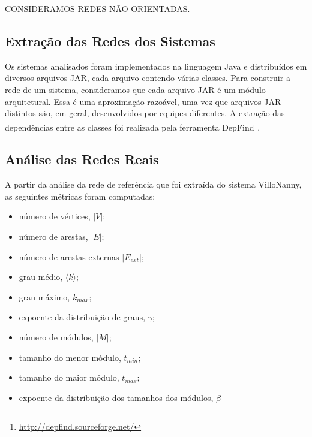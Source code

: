 \documentclass{acm_proc_article-sp}
\begin{document}
CONSIDERAMOS REDES NÃO-ORIENTADAS.

\subsection{Extração das Redes dos Sistemas}

Os sistemas analisados foram implementados na linguagem Java e distribuídos em diversos arquivos JAR, cada arquivo contendo várias classes. Para construir a rede de um sistema, consideramos que cada arquivo JAR é um módulo arquitetural. Essa é uma aproximação razoável, uma vez que arquivos JAR distintos são, em geral, desenvolvidos por equipes diferentes. A extração das dependências entre as classes foi realizada pela ferramenta DepFind\footnote{\url{http://depfind.sourceforge.net/}}.


\subsection{Análise das Redes Reais}


A partir da análise da rede de referência que foi extraída do sistema VilloNanny, as seguintes métricas foram computadas:

\begin{itemize}
\item número de vértices, $|V|$;
\item número de arestas, $|E|$;
\item número de arestas externas $|E_{ext}|$;
\item grau médio, $\langle k \rangle$;
\item grau máximo, $k_{max}$;
\item expoente da distribuição de graus, $\gamma$;
\item número de módulos, $|M|$;
\item tamanho do menor módulo, $t_{min}$;
\item tamanho do maior módulo, $t_{max}$;
\item expoente da distribuição dos tamanhos dos módulos, $\beta$
\end{itemize}
\end{document}
